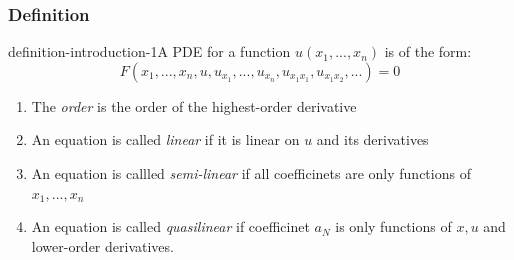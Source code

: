 \subsubsection{Definition}

\begin{mystthmdefinition}{}{definition-introduction-1}A PDE for a function $u(x_1,...,x_n)$ is of the form:
\begin{equation}
F(x_1,...,x_n, u,u_{x_1},...,u_{x_n},u_{x_1x_1},u_{x_1x_2},...)=0
\end{equation}

\begin{enumerate}
\item The \textit{order} is the order of the highest-order derivative
\item An equation is called \textit{linear} if it is linear on $u$ and its derivatives
\item An equation is callled \textit{semi-linear} if all coefficinets are only functions of $x_1,...,x_n$
\item An equation is called \textit{quasilinear} if coefficinet $a_N$ is only functions of $x,u$ and lower-order derivatives.
\end{enumerate}

\end{mystthmdefinition}